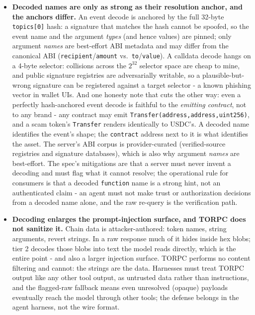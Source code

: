 \documentclass[11pt]{article}
\newcommand{\code}[1]{\texttt{#1}}
\begin{document}
\begin{itemize}[leftmargin=1.4em, itemsep=4pt, topsep=3pt]
\item \textbf{Decoded names are only as strong as their resolution anchor, and the anchors differ.} An event decode is anchored by the full 32-byte \code{topics[0]} hash: a signature that matches the hash cannot be spoofed, so the event name and the argument \emph{types} (and hence values) are pinned; only argument \emph{names} are best-effort ABI metadata and may differ from the canonical ABI (\code{recipient}/\code{amount} vs.\ \code{to}/\code{value}). A calldata decode hangs on a 4-byte selector: collisions across the $2^{32}$ selector space are cheap to mine, and public signature registries \cite{fourbyte} are adversarially writable, so a plausible-but-wrong signature can be registered against a target selector - a known phishing vector in wallet UIs. And one honesty note that cuts the other way: even a perfectly hash-anchored event decode is faithful to the \emph{emitting contract}, not to any brand - any contract may emit \code{Transfer(address,address,uint256)}, and a scam token's \code{Transfer} renders identically to USDC's. A decoded name identifies the event's shape; the \code{contract} address next to it is what identifies the asset. The server's ABI corpus is provider-curated (verified-source registries and signature databases), which is also why argument \emph{names} are best-effort. The spec's mitigations are that a server must never invent a decoding and must flag what it cannot resolve; the operational rule for consumers is that a decoded \code{function} name is a strong hint, not an authenticated claim - an agent must not make trust or authorization decisions from a decoded name alone, and the raw re-query is the verification path.
\item \textbf{Decoding enlarges the prompt-injection surface, and TORPC does not sanitize it.} Chain data is attacker-authored: token names, string arguments, revert strings. In a raw response much of it hides inside hex blobs; tier 2 decodes those blobs into text the model reads directly, which is the entire point - and also a larger injection surface. TORPC performs no content filtering and cannot: the strings are the data. Harnesses must treat TORPC output like any other tool output, as untrusted data rather than instructions, and the flagged-raw fallback means even unresolved (opaque) payloads eventually reach the model through other tools; the defense belongs in the agent harness, not the wire format.

\end{itemize}
\end{document}
